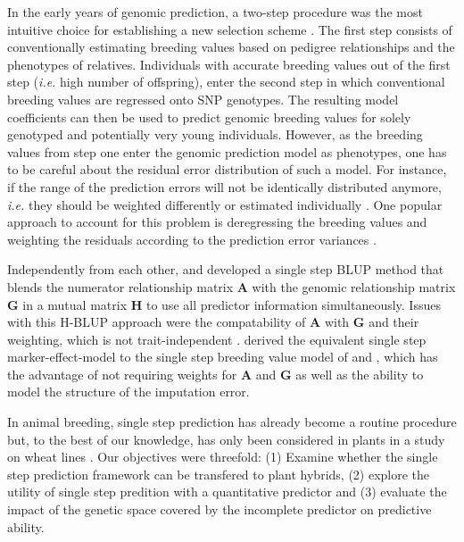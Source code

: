 \documentclass[12pt,titlepage]{article}
\begin{document}
In the early years of genomic prediction, a two-step procedure was the most
intuitive choice for establishing a new selection scheme \cite{VanRaden2009}.
The first step consists of conventionally estimating breeding values based on
pedigree relationships and the phenotypes of relatives.
Individuals with accurate breeding values out of the first step (\textit{i.e.}
high number of offspring), enter the second step in which conventional breeding
values are regressed onto SNP genotypes.
The resulting model coefficients can then be used to predict genomic breeding 
values for solely genotyped and potentially very young individuals.
However, as the breeding values from step one enter the genomic prediction
model as phenotypes, one has to be careful about the residual error
distribution of such a model.
For instance, if the range of the prediction errors will not be identically
distributed anymore, \textit{i.e.} they should be weighted differently or
estimated individually \cite{Aguilar2010}.
One popular approach to account for this problem is deregressing the breeding
values and weighting the residuals according to the prediction error variances
\cite{Garrick2009}.

Independently from each other,  and
 developed a single step BLUP method that blends the 
numerator relationship matrix $\mathbf{A}$ with the genomic relationship matrix
$\mathbf{G}$ in a mutual matrix $\mathbf{H}$ to use all predictor information
simultaneously.
Issues with this H-BLUP approach were the compatability of $\mathbf{A}$ with
$\mathbf{G}$ \cite{Christensen2012} and their weighting, which is not
trait-independent \cite{Vitezica2011,Ashraf2016}.
 derived the equivalent single step marker-effect-model to 
the single step breeding value model of  and 
, which has the advantage of not requiring weights for
$\mathbf{A}$ and $\mathbf{G}$ as well as the ability to model the structure of 
the imputation error.


In animal breeding, single step prediction has already become a routine 
procedure \cite{Legarra2014} but, to the best of our knowledge, has only been 
considered in plants in a study on wheat lines \cite{Ashraf2016}. 
Our objectives were threefold: (1) Examine whether the single step prediction
framework can be transfered to plant hybrids, (2) explore the utility of single 
step predition with a quantitative predictor and (3) evaluate the impact of the
genetic space covered by the incomplete predictor on predictive ability.
\end{document}
